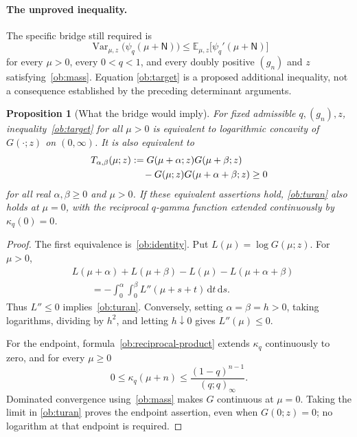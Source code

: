 \documentclass[11pt,a4paper]{article}
\newtheorem{proposition}[theorem]{Proposition}
\theoremstyle{definition}
\theoremstyle{remark}
\begin{document}
\paragraph{The unproved inequality.}
The specific bridge still required is
\begin{equation}\label{ob:target}
 \boxed{\quad
 \operatorname{Var}_{\mu,z}\!\bigl(\psi_q(\mu+\mathsf N)\bigr)
 \le \mathbb E_{\mu,z}\!\bigl[\psi_q'(\mu+\mathsf N)\bigr]
 \quad}
\end{equation}
for every \(\mu>0\), every \(0<q<1\), and every doubly positive
\((g_n)\) and \(z\) satisfying~\eqref{ob:mass}. Equation
\eqref{ob:target} is a proposed additional inequality, not a
consequence established by the preceding determinant arguments.

\begin{proposition}[What the bridge would imply]
\label{ob:turan-equivalence}
For fixed admissible \(q,(g_n),z\), inequality~\eqref{ob:target}
for all \(\mu>0\) is equivalent to logarithmic concavity of
\(G(\cdot;z)\) on \((0,\infty)\). It is also equivalent to
\begin{equation}\label{ob:turan}
 \begin{split}
 T_{\alpha,\beta}(\mu;z)
 &:={G(\mu+\alpha;z)G(\mu+\beta;z)}\\
 &\hspace{1.2em}-{G(\mu;z)G(\mu+\alpha+\beta;z)}\ge0
 \end{split}
\end{equation}
for all real \(\alpha,\beta\ge0\) and \(\mu>0\).
If these equivalent assertions hold, \eqref{ob:turan} also holds
at \(\mu=0\), with the reciprocal \(q\)-gamma function extended
continuously by \(\kappa_q(0)=0\).
\end{proposition}

\begin{proof}
The first equivalence is~\eqref{ob:identity}. Put
\(L(\mu)=\log G(\mu;z)\). For \(\mu>0\),
\begin{align*}
 &L(\mu+\alpha)+L(\mu+\beta)-L(\mu)-L(\mu+\alpha+\beta)\\
 &\qquad=-\int_0^\alpha\int_0^\beta
 L''(\mu+s+t)\,\mathrm dt\,\mathrm ds.
\end{align*}
Thus \(L''\le0\) implies~\eqref{ob:turan}. Conversely, setting
\(\alpha=\beta=h>0\), taking logarithms, dividing by \(h^2\),
and letting \(h\downarrow0\) gives \(L''(\mu)\le0\).

For the endpoint, formula~\eqref{ob:reciprocal-product} extends
\(\kappa_q\) continuously to zero, and for every \(\mu\ge0\)
\[
 0\le\kappa_q(\mu+n)
 \le\frac{(1-q)^{n-1}}{(q;q)_\infty}.
\]
Dominated convergence using~\eqref{ob:mass} makes \(G\)
continuous at \(\mu=0\). Taking the limit in
\eqref{ob:turan} proves the endpoint assertion, even when
\(G(0;z)=0\); no logarithm at that endpoint is required.
\end{proof}
\end{document}
